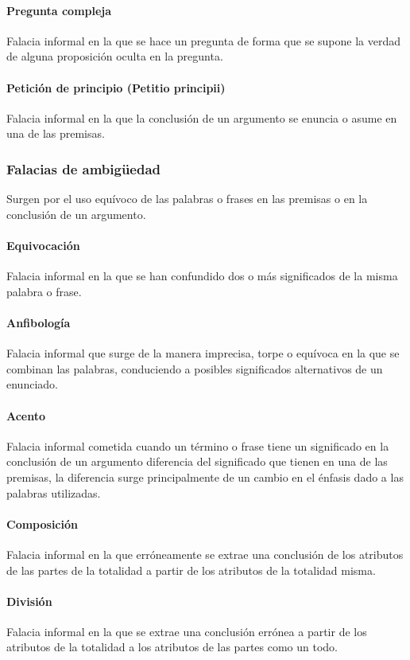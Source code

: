 \documentclass[10pt]{book} 						%
\begin{document}
\paragraph{Pregunta compleja}
Falacia informal en la que se hace un pregunta de forma que se supone la verdad de alguna proposición oculta en la pregunta.
\paragraph{Petición de principio (Petitio principii)}
Falacia informal en la que la conclusión de un argumento se enuncia o asume en una de las premisas.

\subsubsection{Falacias de ambigüedad}
Surgen por el uso equívoco de las palabras o frases en las premisas o en la conclusión de un argumento.
\paragraph{Equivocación}
Falacia informal en la que se han confundido dos o más significados de la misma palabra o frase.
\paragraph{Anfibología}
Falacia informal que surge de la manera imprecisa, torpe o equívoca en la que se combinan las palabras, conduciendo a posibles significados alternativos de un enunciado.
\paragraph{Acento}
Falacia informal cometida cuando un término o frase tiene un significado en la conclusión de un argumento diferencia del significado que tienen en una de las premisas, la diferencia surge principalmente de un cambio en el énfasis dado a las palabras utilizadas.
\paragraph{Composición}
Falacia informal en la que erróneamente se extrae una conclusión de los atributos de las partes de la totalidad a partir de los atributos de la totalidad misma.
\paragraph{División}
Falacia informal en la que se extrae una conclusión errónea a partir de los atributos de la totalidad a los atributos de las partes como un todo.
\end{document}
